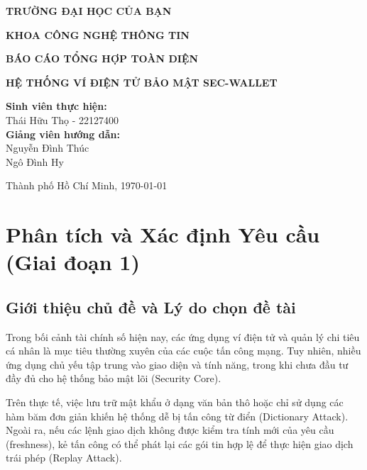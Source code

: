 \documentclass[11pt,a4paper]{article}
\begin{document}
\begin{titlepage}
    \centering
    \vspace*{1cm}
    {\huge \textbf{TRƯỜNG ĐẠI HỌC CỦA BẠN} \par}
    {\Large \textbf{KHOA CÔNG NGHỆ THÔNG TIN} \par}
    \vspace{1.5cm}
    {\huge \textbf{BÁO CÁO TỔNG HỢP TOÀN DIỆN} \par}
    \vspace{0.5cm}
    {\Huge \textbf{HỆ THỐNG VÍ ĐIỆN TỬ BẢO MẬT SEC-WALLET} \par}
    \vspace{1.5cm}
    \textbf{Sinh viên thực hiện:} \\
    Thái Hữu Thọ - 22127400 \\
    \vspace{1cm}
    \textbf{Giảng viên hướng dẫn:} \\
    Nguyễn Đình Thúc \\
    Ngô Đình Hy \\
    \vfill
    {\large Thành phố Hồ Chí Minh, \today \par}
\end{titlepage}

\tableofcontents
\newpage

\section{Phân tích và Xác định Yêu cầu (Giai đoạn 1)}
\subsection{Giới thiệu chủ đề và Lý do chọn đề tài}
Trong bối cảnh tài chính số hiện nay, các ứng dụng ví điện tử và quản lý chi tiêu cá nhân là mục tiêu thường xuyên của các cuộc tấn công mạng. Tuy nhiên, nhiều ứng dụng chủ yếu tập trung vào giao diện và tính năng, trong khi chưa đầu tư đầy đủ cho hệ thống bảo mật lõi (Security Core).

Trên thực tế, việc lưu trữ mật khẩu ở dạng văn bản thô hoặc chỉ sử dụng các hàm băm đơn giản khiến hệ thống dễ bị tấn công từ điển (Dictionary Attack). Ngoài ra, nếu các lệnh giao dịch không được kiểm tra tính mới của yêu cầu (freshness), kẻ tấn công có thể phát lại các gói tin hợp lệ để thực hiện giao dịch trái phép (Replay Attack).
\end{document}
